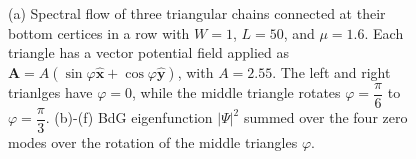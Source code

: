 \documentclass[aps,prb,showpacs,amsmath,amssymb,superscriptaddress]{revtex4-2}
\let\oldhat\hat
\renewcommand{\hat}[1]{\oldhat{\mathbf{#1}}}
\begin{document}
\begin{figure}
  \vspace{-40pt}
  \caption{(a) Spectral flow of three triangular chains connected at their bottom certices in a row with $W=1$, $L=50$, and $\mu=1.6$. Each triangle has a vector potential field applied as $\mathbf A = A(\sin\varphi \hat{x} + \cos\varphi \hat{y})$, with $A=2.55$. The left and right trianlges have $\varphi=0$, while the middle triangle rotates $\varphi = \dfrac{\pi}{6}$ to $\varphi = \dfrac{\pi}{3}$. (b)-(f) BdG eigenfunction $|\Psi|^2$ summed over the four zero modes over the rotation of the middle triangles $\varphi$. }
\end{figure}


\end{document}
